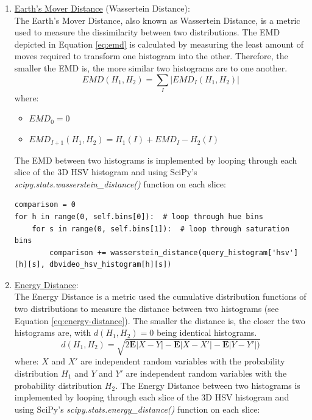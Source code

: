 \begin{enumerate}
    
    \item \underline{Earth's Mover Distance} (Wassertein Distance):\\
    The Earth's Mover Distance, also known as Wassertein Distance, is a metric used to measure the dissimilarity between two distributions. The EMD depicted in Equation \ref{eq:emd} is calculated by measuring the least amount of moves required to transform one histogram into the other. Therefore, the smaller the EMD is, the more similar two histograms are to one another.
    \begin{equation}
    \label{eq:emd}
        EMD(H_1,H_2)=\sum_I |EMD_I(H_1,H_2)|
    \end{equation}
    where:
        \begin{itemize}
            \item $EMD_0 = 0$
            \item $EMD_{I+1}(H_1,H_2) = H_1(I)+EMD_I-H_2(I)$
        \end{itemize}
    The EMD between two histograms is implemented by looping through each slice of the 3D HSV histogram and using SciPy's \textit{scipy.stats.wasserstein\_distance()} function on each slice:
    
\begin{verbatim}
comparison = 0
for h in range(0, self.bins[0]):  # loop through hue bins
    for s in range(0, self.bins[1]):  # loop through saturation bins
        comparison += wasserstein_distance(query_histogram['hsv'][h][s], dbvideo_hsv_histogram[h][s])
\end{verbatim}
        
    \item \underline{Energy Distance}:\\
    The Energy Distance is a metric used the cumulative distribution functions of two distributions to measure the distance between two histograms (see Equation \ref{eq:energy-distance}). The smaller the distance is, the closer the two histograms are, with $d(H_1,H_2)=0$ being identical histograms.
    \begin{equation}
    \label{eq:energy-distance}
        d(H_1,H_2) = \sqrt{2\mathbf{E}|X-Y|-\mathbf{E}|X-X'|-\mathbf{E}|Y-Y'|)}
    \end{equation}
    where: $X$ and $X'$ are independent random variables with the probability distribution $H_1$ and $Y$ and $Y'$ are independent random variables with the probability distribution $H_2$.  The Energy Distance between two histograms is implemented by looping through each slice of the 3D HSV histogram and using SciPy's \textit{scipy.stats.energy\_distance()} function on each slice:
    

\end{enumerate}
